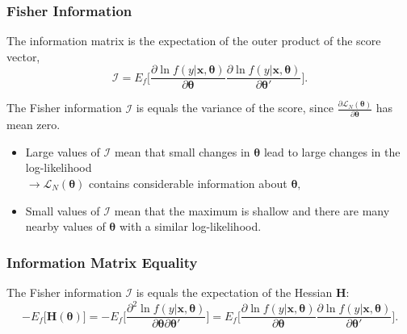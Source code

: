 \documentclass[a4paper,12pt]{article}
\begin{document}
\subsubsection*{Fisher Information}
The information matrix is the expectation of the outer product of the score vector,
$$\mathcal{I}=E_f\bigg[\frac{\partial \ln f(y|\boldsymbol{x},\boldsymbol{\theta})}{\partial \boldsymbol{\theta}}\frac{\partial \ln f(y|\boldsymbol{x},\boldsymbol{\theta})}{\partial \boldsymbol{\theta}'}\bigg].$$

The Fisher information $\mathcal{I}$ is equals the variance of the score, since $\frac{\partial \mathcal{L}_N(\boldsymbol{\theta})}{\partial \boldsymbol{\theta}}$ has mean zero.
\begin{itemize}
	\item Large values of $\mathcal{I}$ mean that small changes in $\boldsymbol{\theta}$ lead to large changes in the log-likelihood \\$\rightarrow \mathcal{L}_N(\boldsymbol{\theta})$ contains considerable
information about $\boldsymbol{\theta},$
	\item Small values of $\mathcal{I}$ mean that the maximum is shallow and there are many nearby values of $\boldsymbol{\theta}$ with a similar log-likelihood.
\end{itemize}



\subsubsection*{Information Matrix Equality}

The Fisher information $\mathcal{I}$ is equals the expectation of the Hessian $\boldsymbol{H}$:
$$-E_f\bigg[\boldsymbol{H}(\boldsymbol{\theta})\bigg]=-E_f\bigg[\frac{\partial^2 \ln f(y|\boldsymbol{x},\boldsymbol{\theta})}{\partial \boldsymbol{\theta}\partial\boldsymbol{\theta}'}\bigg]=E_f\bigg[\frac{\partial \ln f(y|\boldsymbol{x},\boldsymbol{\theta})}{\partial \boldsymbol{\theta}}\frac{\partial \ln f(y|\boldsymbol{x},\boldsymbol{\theta})}{\partial \boldsymbol{\theta}'}\bigg].$$
\end{document}

